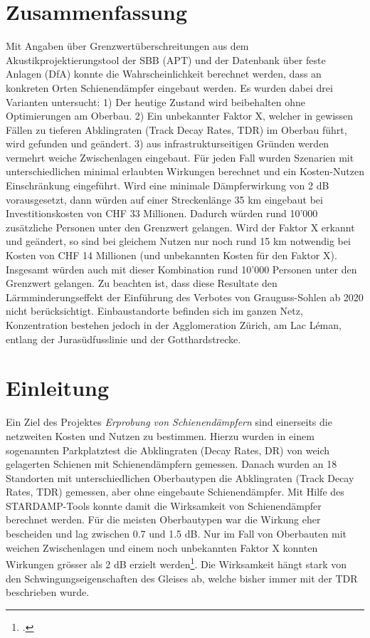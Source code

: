 \section*{Zusammenfassung}%
Mit Angaben über Grenzwertüberschreitungen aus dem Akustikprojektierungstool der SBB (APT) und der Datenbank über feste Anlagen (DfA) konnte die Wahrscheinlichkeit berechnet werden, dass an konkreten Orten Schienendämpfer eingebaut werden. Es wurden dabei drei Varianten untersucht: 1) Der heutige Zustand wird beibehalten ohne Optimierungen am Oberbau. 2) Ein unbekannter Faktor X, welcher in gewissen Fällen zu tieferen Abklingraten (Track Decay Rates, TDR) im Oberbau führt, wird gefunden und geändert. 3) aus infrastrukturseitigen Gründen werden vermehrt weiche Zwischenlagen eingebaut. Für jeden Fall wurden Szenarien mit unterschiedlichen minimal erlaubten Wirkungen berechnet und ein Kosten-Nutzen Einschränkung eingeführt. Wird eine minimale Dämpferwirkung von 2 dB vorausgesetzt, dann würden auf einer Streckenlänge 35 km eingebaut bei Investitionskosten von CHF 33 Millionen. Dadurch würden rund 10'000 zusätzliche Personen unter den Grenzwert gelangen. Wird der Faktor X erkannt und geändert, so sind bei gleichem Nutzen nur noch rund 15 km notwendig bei Kosten von CHF 14 Millionen (und unbekannten Kosten für den Faktor X). Insgesamt würden auch mit dieser Kombination rund 10'000 Personen unter den Grenzwert gelangen. Zu beachten ist, dass diese Resultate den Lärmminderungseffekt der Einführung des Verbotes von Grauguss-Sohlen ab 2020 nicht berücksichtigt. Einbaustandorte befinden sich im ganzen Netz, Konzentration bestehen jedoch in der Agglomeration Zürich, am Lac Léman, entlang der Jurasüdfusslinie und der Gotthardstrecke. 

\section{Einleitung}
Ein Ziel des Projektes \emph{Erprobung von Schienendämpfern} sind einerseits die netzweiten Kosten und Nutzen zu bestimmen. Hierzu wurden in einem sogenannten Parkplatztest die Abklingraten (Decay Rates, DR) von weich gelagerten Schienen mit Schienendämpfern gemessen. Danach wurden an 18 Standorten mit unterschiedlichen Oberbautypen die Abklingraten (Track Decay Rates, TDR) gemessen, aber ohne eingebaute Schienendämpfer. Mit Hilfe des STARDAMP-Tools konnte damit die Wirksamkeit von Schienendämpfer berechnet werden. Für die meisten Oberbautypen war die Wirkung eher bescheiden und lag zwischen 0.7 und 1.5 dB. Nur im Fall von Oberbauten mit weichen Zwischenlagen und einem noch unbekannten Faktor X konnten Wirkungen grösser als 2 dB erzielt werden\footcite{sbbWCalc}. Die Wirksamkeit hängt stark von den Schwingungseigenschaften des Gleises ab, welche bisher immer mit der TDR beschrieben wurde. \\

